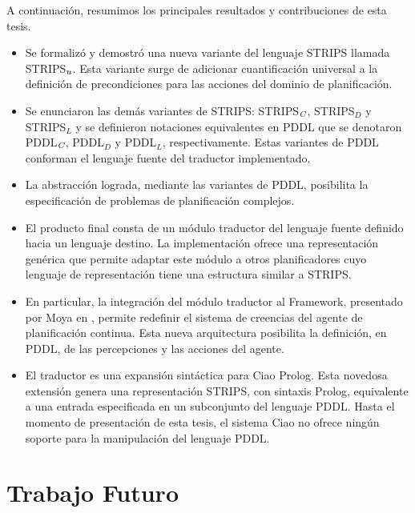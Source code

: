 A continuaci\'on, resumimos los principales resultados y
contribuciones de esta tesis.

\begin{itemize}

\item Se formaliz\'o y demostr\'o una nueva variante del lenguaje
STRIPS llamada STRIPS$_{\emph{u}}$. Esta variante surge de adicionar cuantificaci\'on universal 
a la definici\'on de precondiciones para las acciones del dominio de
planificaci\'on. 

\item Se enunciaron las dem\'as variantes de STRIPS: STRIPS$_{\emph{C}}$, STRIPS$_{D}$ y
STRIPS$_{L}$ y se definieron notaciones equivalentes en PDDL que se denotaron
PDDL$_{\emph{C}}$, PDDL$_{D}$ y PDDL$_{L}$, respectivamente. 
Estas variantes de PDDL conforman el lenguaje fuente del traductor implementado.

\item La abstracci\'on lograda, mediante las variantes de PDDL, posibilita
la especificaci\'on de problemas de planificaci\'on complejos.

\item El producto final consta de un m\'odulo traductor del lenguaje fuente
definido hacia un lenguaje destino. La implementaci\'on ofrece una
representaci\'on gen\'erica que permite adaptar este
m\'odulo a otros planificadores cuyo lenguaje de representaci\'on
tiene una estructura similar a STRIPS.

\item En particular, la integraci\'on del m\'odulo traductor al
Framework, presentado por Moya en \cite{gbraun:tesisMarioMoya}, 
permite redefinir el sistema de creencias del agente de
planificaci\'on continua. Esta nueva arquitectura posibilita la
definici\'on, en PDDL, de las percepciones y las acciones del agente.

\item El traductor es una expansi\'on sint\'actica para Ciao
Prolog. Esta novedosa extensi\'on genera una representaci\'on STRIPS,
con sintaxis Prolog, equivalente a una entrada
especificada en un subconjunto del lenguaje PDDL. Hasta el momento de presentaci\'on de
esta tesis, el sistema Ciao no ofrece ning\'un soporte para la
manipulaci\'on del lenguaje PDDL.

\end{itemize}

\section{Trabajo Futuro}

